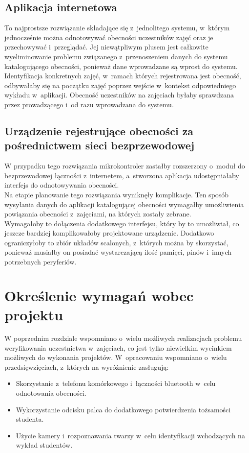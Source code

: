 \documentclass[declaration,shortabstract, mgr]{iithesis}
\begin{document}
\subsection{Aplikacja internetowa}
\indent To najprostsze rozwiązanie składające się z~jednolitego systemu, w~którym jednocześnie można odnotowywać obecności uczestników zajęć oraz je przechowywać i~przeglądać. Jej niewątpliwym plusem jest całkowite wyeliminowanie problemu związanego z~przenoszeniem danych do systemu katalogującego obecności, ponieważ dane wprowadzane są wprost do systemu. Identyfikacja konkretnych zajęć, w~ramach których rejestrowana jest obecność, odbywałaby się na początku zajęć poprzez wejście w~kontekst odpowiedniego wykładu w~aplikacji. Obecność uczestników na zajęciach byłaby sprawdzana przez prowadzącego i~od razu wprowadzana do systemu. \\

\subsection{Urządzenie rejestrujące obecności za pośrednictwem sieci bezprzewodowej}
\indent W przypadku tego rozwiązania mikrokontroler zastałby rozszerzony o~moduł do bezprzewodowej łączności z~internetem, a~stworzona aplikacja udostępniałaby interfejs do odnotowywania obecności. \\
\indent Na etapie planowanie tego rozwiązania wyniknęły komplikacje. Ten sposób wysyłania danych do aplikacji katalogującej obecności wymagałby umożliwienia powiązania obecności z~zajęciami, na których zostały zebrane. \\
\indent Wymagałoby to dołączenia dodatkowego interfejsu, który by to umożliwiał, co jeszcze bardziej komplikowałoby projektowane urządzenie. Dodatkowo ograniczyłoby to zbiór układów scalonych, z~których można by skorzystać, ponieważ musiałby on posiadać wystarczającą ilość pamięci, pinów i~innych potrzebnych peryferiów.

\section{Określenie wymagań wobec projektu}
\indent W poprzednim rozdziale wspomniano o~wielu możliwych realizacjach problemu weryfikowania uczestnictwa w~zajęciach, co jest tylko niewielkim wycinkiem możliwych do wykonania projektów. W~opracowaniu \cite{review} wspomniano o~wielu przedsięwzięciach, z~których na wyróżnienie zasługują:

\begin{itemize}
\item Skorzystanie z~telefonu komórkowego i~łączności bluetooth w~celu odnotowania obecności.
\item Wykorzystanie odcisku palca do dodatkowego potwierdzenia tożsamości studenta.
\item Użycie kamery i~rozpoznawania twarzy w~celu identyfikacji wchodzących na wykład studentów.
\end{itemize}
\end{document}
